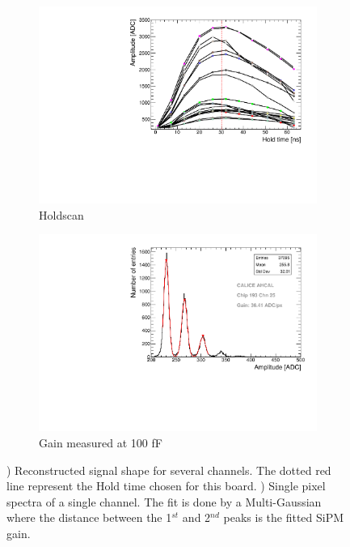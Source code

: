 \begin{figure}[htbp!]
  \centering
  \begin{subfigure}[t]{0.49\textwidth}
    \includegraphics[width=1.\linewidth]{../Thesis_Plots/Commissioning/Plots/Holdscan_HBU2_15.pdf}
    \caption{Holdscan} \label{fig:Holdscan}
  \end{subfigure}
  \hfill
  \begin{subfigure}[t]{0.49\textwidth}
    \includegraphics[width=1.\linewidth]{../Thesis_Plots/Commissioning/Plots/Gain100fF_MainzHBU4.pdf}
    \caption{Gain measured at 100 fF} \label{fig:Gain100fF}
  \end{subfigure}
  \caption{) Reconstructed signal shape for several channels. The dotted red line represent the Hold time chosen for this board. ) Single pixel spectra of a single channel. The fit is done by a Multi-Gaussian where the distance between the 1$^{st}$ and 2$^{nd}$ peaks is the fitted SiPM gain.}
\end{figure}

